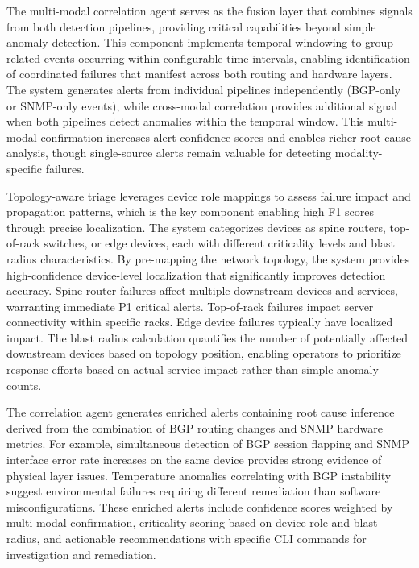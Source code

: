 \documentclass[11pt]{article}
\begin{document}
The multi-modal correlation agent serves as the fusion layer that combines signals from both detection pipelines, providing critical capabilities beyond simple anomaly detection. This component implements temporal windowing to group related events occurring within configurable time intervals, enabling identification of coordinated failures that manifest across both routing and hardware layers. The system generates alerts from individual pipelines independently (BGP-only or SNMP-only events), while cross-modal correlation provides additional signal when both pipelines detect anomalies within the temporal window. This multi-modal confirmation increases alert confidence scores and enables richer root cause analysis, though single-source alerts remain valuable for detecting modality-specific failures.

Topology-aware triage leverages device role mappings to assess failure impact and propagation patterns, which is the key component enabling high F1 scores through precise localization. The system categorizes devices as spine routers, top-of-rack switches, or edge devices, each with different criticality levels and blast radius characteristics. By pre-mapping the network topology, the system provides high-confidence device-level localization that significantly improves detection accuracy. Spine router failures affect multiple downstream devices and services, warranting immediate P1 critical alerts. Top-of-rack failures impact server connectivity within specific racks. Edge device failures typically have localized impact. The blast radius calculation quantifies the number of potentially affected downstream devices based on topology position, enabling operators to prioritize response efforts based on actual service impact rather than simple anomaly counts.

The correlation agent generates enriched alerts containing root cause inference derived from the combination of BGP routing changes and SNMP hardware metrics. For example, simultaneous detection of BGP session flapping and SNMP interface error rate increases on the same device provides strong evidence of physical layer issues. Temperature anomalies correlating with BGP instability suggest environmental failures requiring different remediation than software misconfigurations. These enriched alerts include confidence scores weighted by multi-modal confirmation, criticality scoring based on device role and blast radius, and actionable recommendations with specific CLI commands for investigation and remediation.
\end{document}

